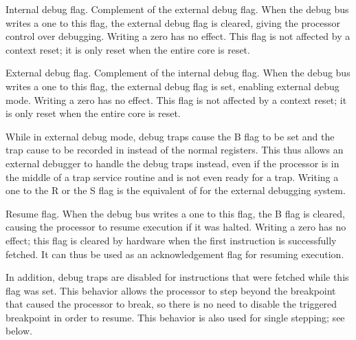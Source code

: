 \implementation{}

Internal debug flag. Complement of the external debug flag. When the debug bus 
writes a one to this flag, the external debug flag is cleared, giving the
processor control over debugging. Writing a zero has no effect. This flag is not
affected by a context reset; it is only reset when the entire core is reset.

\implementation{}

External debug flag. Complement of the internal debug flag. When the debug bus 
writes a one to this flag, the external debug flag is set, enabling external 
debug mode. Writing a zero has no effect. This flag is not affected by a context 
reset; it is only reset when the entire core is reset.

While in external debug mode, debug traps cause the B flag to be set and the 
trap cause to be recorded in  instead of the normal registers. This 
thus allows an external debugger to handle the debug traps instead, even if the 
processor is in the middle of a trap service routine and is not even ready for a 
trap. Writing a one to the R or the S flag is the equivalent of  for 
the external debugging system. 

\implementation{}

Resume flag. When the debug bus writes a one to this flag, the B flag is
cleared, causing the processor to resume execution if it was halted. Writing a
zero has no effect; this flag is cleared by hardware when the first instruction
is successfully fetched. It can thus be used as an acknowledgement flag for
resuming execution.

In addition, debug traps are disabled for instructions that were fetched while
this flag was set. This behavior allows the processor to step beyond the
breakpoint that caused the processor to break, so there is no need to disable
the triggered breakpoint in order to resume. This behavior is also used for
single stepping; see below.

